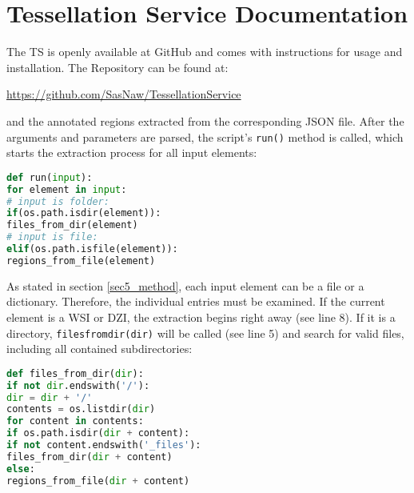 \chapter{Tessellation Service Documentation}
\label{secC}
The TS is openly available at GitHub and comes with instructions for usage and installation. The Repository can be found at:

\url{https://github.com/SasNaw/TessellationService}



and the annotated regions extracted from the corresponding JSON file. After the arguments and parameters are parsed, the script's \texttt{run()} method is called, which starts the extraction process for all input elements:


\begin{lstlisting}[frame=single, language=python, title=\texttt{run()} from TessellationService.py]
def run(input):
for element in input:
# input is folder:
if(os.path.isdir(element)):
files_from_dir(element)
# input is file:
elif(os.path.isfile(element)):
regions_from_file(element)
\end{lstlisting}





As stated in section \ref{sec5_method}, each input element can be a file or a dictionary. Therefore, the individual entries must be examined. If the current element is a WSI or DZI, the extraction begins right away (see line 8). If it is a directory, \texttt{files{\textunderscore}from{\textunderscore}dir(dir)} will be called (see line 5) and search for valid files, including all contained subdirectories:

\begin{lstlisting}[frame=single, language=python, title=\texttt{files{\textunderscore}from{\textunderscore}dir(dir)} from TessellationService.py]
def files_from_dir(dir):
if not dir.endswith('/'):
dir = dir + '/'
contents = os.listdir(dir)
for content in contents:
if os.path.isdir(dir + content):
if not content.endswith('_files'):
files_from_dir(dir + content)
else:
regions_from_file(dir + content)
\end{lstlisting}


